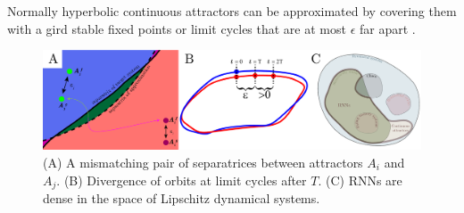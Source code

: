 \documentclass[10pt]{article}
\begin{document}
Normally hyperbolic continuous attractors can be approximated by covering them with a gird stable fixed points or limit cycles that are at most $\epsilon$ far apart \citep{Sagodi2024a}.

\begin{figure}[tbhp]
  \centering
  \includegraphics[width=\textwidth]{icmns2025_figure}
  \caption{(A) 	A mismatching pair of separatrices between attractors $A_i$ and $A_j$.
  		(B) Divergence of orbits at limit cycles after $T$.
  		(C) RNNs are dense in the space of Lipschitz dynamical systems.
  }\label{fig:figure}
\end{figure}



\end{document}
